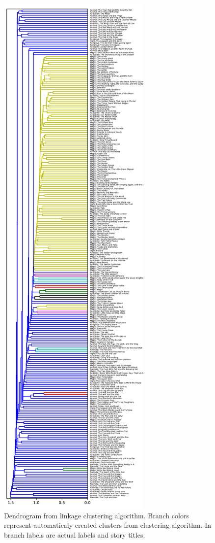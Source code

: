\documentclass[a4paper]{article}
\begin{document}
\begin{figure}
\centering
\includegraphics[height=0.9\textheight]{plots/dendrogram.pdf}
\caption{Dendrogram from linkage clustering algorithm. Branch colors represent automaticaly created clusters from clustering algorithm. In branch labels are actual labels and story titles.}
\label{fig:dend}
\end{figure}
\end{document}
